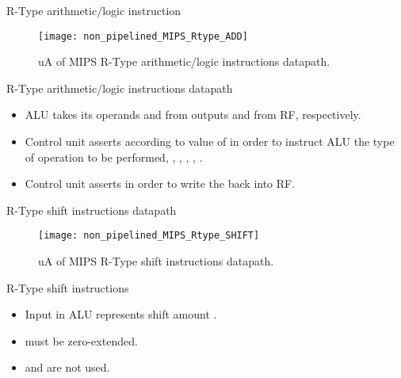 % 
\begin{frame}{R-Type arithmetic/logic instruction}
  \begin{figure}
  \centering
  \texttt{[image: non\_pipelined\_MIPS\_Rtype\_ADD]}
  \vspace{-1pt}
  \caption{\ac{uA} of \ac{MIPS} R-Type arithmetic/logic instructions datapath.}
  \label{Figure:non_pipelined_MIPS_Rtype_ADD}
  \end{figure}
\end{frame}

% 
\begin{frame}{R-Type arithmetic/logic instructions datapath}
\begin{itemize}
\item \ac{ALU} takes its operands  and  from outputs  and  from \ac{RF}, respectively.
\item Control unit asserts  according to value of  in order to instruct \ac{ALU} the type of operation to be performed, \ie, , , , \etc. 
\item Control unit asserts  in order to write the  back into \ac{RF}.
\end{itemize}
\end{frame}

% 
\begin{frame}{R-Type shift instructions datapath}
  \begin{figure}
  \centering
  \texttt{[image: non\_pipelined\_MIPS\_Rtype\_SHIFT]}
  \vspace{-3pt}
  \caption{\ac{uA} of \ac{MIPS} R-Type shift instructions datapath.}
  \label{Figure:non_pipelined_MIPS_Rtype_SHIFT}
  \end{figure}
\end{frame}

% 
\begin{frame}{R-Type shift instructions}
\begin{itemize}
\item Input  in \ac{ALU} represents shift amount .
\item {} must be zero-extended.
\item {} and  are not used.
\end{itemize}
\end{frame}

